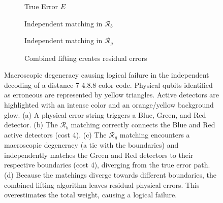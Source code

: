 \documentclass{article}
\begin{document}
\begin{figure}[hbt!]
    \centering
    \begin{subfigure}[b]{0.48\textwidth}
        \centering
        \resizebox{\linewidth}{!}{
            
        }
        \caption{True Error $E$}
        \label{fig:corr_struggle_2_a}
    \end{subfigure}
    \hfill
    \begin{subfigure}[b]{0.48\textwidth}
        \centering
        \resizebox{\linewidth}{!}{
            
        }
        \caption{Independent matching in $\mathcal{R}_b$}
        \label{fig:corr_struggle_2_b}
    \end{subfigure}
    
    \vspace{0.5cm}
    
    \begin{subfigure}[b]{0.48\textwidth}
        \centering
        \resizebox{\linewidth}{!}{
            
        }
        \caption{Independent matching in $\mathcal{R}_g$}
        \label{fig:corr_struggle_2_c}
    \end{subfigure}
    \hfill
    \begin{subfigure}[b]{0.48\textwidth}
        \centering
        \resizebox{\linewidth}{!}{
            
        }
        \caption{Combined lifting creates residual errors}
        \label{fig:corr_struggle_2_d}
    \end{subfigure}
    
    \caption{Macroscopic degeneracy causing logical failure in the independent decoding of a distance-7 4.8.8 color code. Physical qubits identified as erroneous are represented by yellow triangles. Active detectors are highlighted with an intense color and an orange/yellow background glow. (a) A physical error string triggers a Blue, Green, and Red detector. (b) The $\mathcal{R}_b$ matching correctly connects the Blue and Red active detectors (cost 4). (c) The $\mathcal{R}_g$ matching encounters a macroscopic degeneracy (a tie with the boundaries) and independently matches the Green and Red detectors to their respective boundaries (cost 4), diverging from the true error path. (d) Because the matchings diverge towards different boundaries, the combined lifting algorithm leaves residual physical errors. This overestimates the total weight, causing a logical failure.}
    \label{fig:correlated_struggle_2}
\end{figure}
\end{document}
